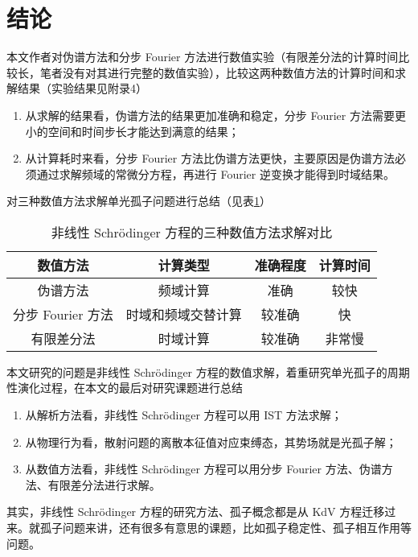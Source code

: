 \section{结论}
本文作者对伪谱方法和分步 Fourier 方法进行数值实验（有限差分法的计算时间比较长，笔者没有对其进行完整的数值实验），比较这两种数值方法的计算时间和求解结果（实验结果见附录4）
\begin{enumerate}[label=(\arabic*)]
    \item 从求解的结果看，伪谱方法的结果更加准确和稳定，分步 Fourier 方法需要更小的空间和时间步长才能达到满意的结果；
    \item 从计算耗时来看，分步 Fourier 方法比伪谱方法更快，主要原因是伪谱方法必须通过求解频域的常微分方程，再进行 Fourier 逆变换才能得到时域结果。
\end{enumerate}
对三种数值方法求解单光孤子问题进行总结（见表\ref{tab:compare}）
\begin{table}[htbp]
    \centering
    \caption{非线性 Schr\"odinger 方程的三种数值方法求解对比}
    \label{tab:compare}
    \begin{tabular}{cccc}
      \toprule 
        数值方法 & 计算类型 & 准确程度 & 计算时间 \\
      \midrule  
        伪谱方法 & 频域计算 & 准确 & 较快 \\
        分步 Fourier 方法 & 时域和频域交替计算 & 较准确 & 快 \\
        有限差分法 & 时域计算 & 较准确 & 非常慢 \\
      \bottomrule
    \end{tabular}
\end{table}

本文研究的问题是非线性 Schr\"odinger 方程的数值求解，着重研究单光孤子的周期性演化过程，在本文的最后对研究课题进行总结
\begin{enumerate}[label=(\arabic*)]
    \item 从解析方法看，非线性 Schr\"odinger 方程可以用 IST 方法求解；
    \item 从物理行为看，散射问题的离散本征值对应束缚态，其势场就是光孤子解；
    \item 从数值方法看，非线性 Schr\"odinger 方程可以用分步 Fourier 方法、伪谱方法、有限差分法进行求解。
\end{enumerate}
其实，非线性 Schr\"odinger 方程的研究方法、孤子概念都是从 KdV 方程迁移过来。就孤子问题来讲，还有很多有意思的课题，比如孤子稳定性、孤子相互作用等问题。